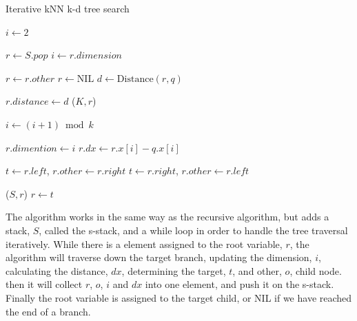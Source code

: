 \begin{algorithm}
\caption{Iterative kNN k-d tree search}
\label{alg:iterative_knn_kd_tree_search}
\begin{algorithmic}
        \State {}

        \State $i \gets 2$

                \State $r \gets S.pop$
                \State $i \gets r.dimension$

                 
                    \State $r \gets r.other$
                \Else
                    \State $r \gets \text{NIL}$
                \EndIf
            \Else
                \State $d \gets \text{Distance}(r, q)$

                 
                    \State $r.distance \gets d$
                    \State {}($K, r$)
                \EndIf

                \State $i \gets (i + 1) \bmod k$ 

                \State $r.dimention \gets i$
                \State $r.dx \gets r.x[i] - q.x[i]$

                  
                    \State $t \gets r.left$, $r.other \gets r.right$
                \Else
                    \State $t \gets r.right$, $r.other \gets r.left$
                \EndIf

                \State {}($S, r$)
                \State $r \gets t$
            \EndIf

        \EndWhile
    \EndProcedure
\end{algorithmic}
\end{algorithm}

The algorithm works in the same way as the recursive algorithm, but adds a stack, $S$, called the s-stack, and a while loop in order to handle the tree traversal iteratively. While there is a element assigned to the root variable, $r$, the algorithm will traverse down the target branch, updating the dimension, $i$, calculating the distance, $dx$, determining the target, $t$, and other, $o$, child node. then it will collect $r$, $o$, $i$ and $dx$ into one element, and push it on the s-stack. Finally the root variable is assigned to the target child, or NIL if we have reached the end of a branch.

